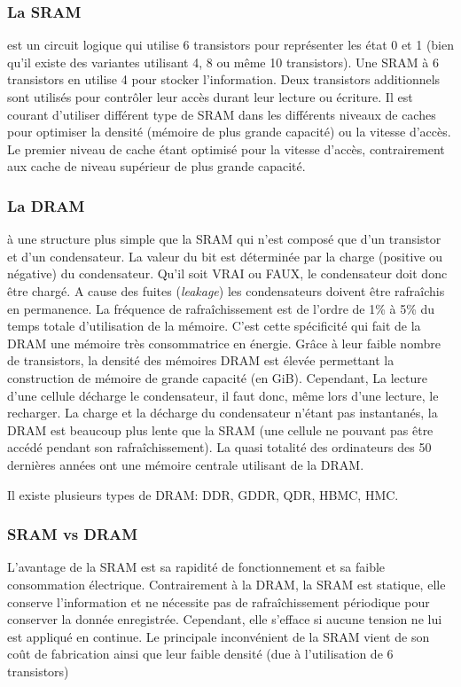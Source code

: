 \subsubsection{La SRAM} est un circuit logique qui utilise 6 transistors pour représenter les état 0 et 1 (bien qu'il existe des variantes utilisant 4, 8 ou même 10 transistors). Une SRAM à 6 transistors en utilise 4 pour stocker l'information. Deux transistors additionnels sont utilisés pour contrôler leur accès durant leur lecture ou écriture.
Il est courant d'utiliser différent type de SRAM dans les différents niveaux de caches pour optimiser la densité (mémoire de plus grande capacité) ou la vitesse d'accès. Le premier niveau de cache étant optimisé pour la vitesse d'accès, contrairement aux cache de niveau supérieur de plus grande capacité.


\subsubsection{La DRAM} à une structure plus simple que la SRAM qui n'est composé que d'un transistor et d'un condensateur. La valeur du bit est déterminée par la charge (positive ou négative) du condensateur. Qu'il soit VRAI ou FAUX, le condensateur doit donc être chargé. 
A cause des fuites (\textit{leakage}) les condensateurs doivent être rafraîchis en permanence. La fréquence de rafraîchissement est de l'ordre de 1\% à 5\% du temps totale d'utilisation de la mémoire. C'est cette spécificité qui fait de la DRAM une mémoire très consommatrice en énergie. Grâce à leur faible nombre de transistors, la densité des mémoires DRAM est élevée permettant la construction de mémoire de grande capacité (en GiB). Cependant, La lecture d'une cellule décharge le condensateur, il faut donc, même lors d'une lecture, le recharger.
La charge et la décharge du condensateur n'étant pas instantanés, la DRAM est beaucoup plus lente que la SRAM (une cellule ne pouvant pas être accédé pendant son rafraîchissement).
La quasi totalité des ordinateurs des 50 dernières années ont une mémoire centrale utilisant de la DRAM.

Il existe plusieurs types de DRAM: DDR, GDDR, QDR, HBMC, HMC.


\subsubsection{SRAM vs DRAM}

L'avantage de la SRAM est sa rapidité de fonctionnement et sa faible consommation électrique. Contrairement à la DRAM, la SRAM est statique, elle conserve l'information et ne nécessite pas de rafraîchissement périodique pour conserver la donnée enregistrée. Cependant, elle s'efface si aucune tension ne lui est appliqué en continue.
Le principale inconvénient de la SRAM vient de son coût de fabrication ainsi que leur faible densité (due à l'utilisation de 6 transistors)


